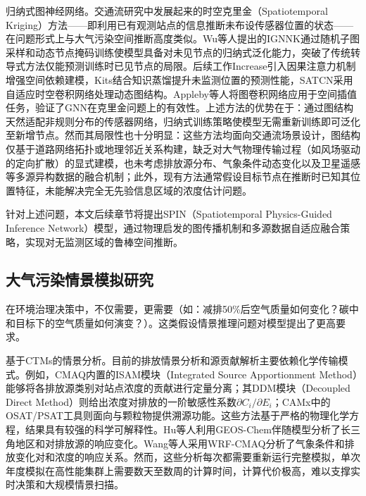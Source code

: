归纳式图神经网络。交通流研究中发展起来的时空克里金（Spatiotemporal Kriging）方法——即利用已有观测站点的信息推断未布设传感器位置的状态——在问题形式上与大气污染空间推断高度类似。Wu等人提出的IGNNK\citep{wu2021inductive}通过随机子图采样和动态节点掩码训练使模型具备对未见节点的归纳式泛化能力，突破了传统转导式方法仅能预测训练时已见节点的局限。后续工作Increase\citep{zheng2023increase}引入因果注意力机制增强空间依赖建模，Kits\citep{xu2025kits}结合知识蒸馏提升未监测位置的预测性能，SATCN\citep{wu2021spatial}采用自适应时空卷积网络处理动态图结构。Appleby等人\citep{appleby2020kriging}将图卷积网络应用于空间插值任务，验证了GNN在克里金问题上的有效性。上述方法的优势在于：通过图结构天然适配非规则分布的传感器网络，归纳式训练策略使模型无需重新训练即可泛化至新增节点。然而其局限性也十分明显：这些方法均面向交通流场景设计，图结构仅基于道路网络拓扑或地理邻近关系构建，缺乏对大气物理传输过程（如风场驱动的定向扩散）的显式建模，也未考虑排放源分布、气象条件动态变化以及卫星遥感等多源异构数据的融合机制；此外，现有方法通常假设目标节点在推断时已知其位置特征，未能解决完全无先验信息区域的浓度估计问题。

针对上述问题，本文后续章节将提出SPIN（Spatiotemporal Physics-Guided Inference Network）模型，通过物理启发的图传播机制和多源数据自适应融合策略，实现对无监测区域的鲁棒空间推断。

\subsection{大气污染情景模拟研究}
\label{subsec:simulation_review}

在环境治理决策中，不仅需要，更需要（如：减排50\%后空气质量如何变化？碳中和目标下的空气质量如何演变？）。这类假设情景推理问题对模型提出了更高要求。

基于CTMs的情景分析。目前的排放情景分析和源贡献解析主要依赖化学传输模式。例如，CMAQ内置的ISAM模块（Integrated Source Apportionment Method）能够将各排放源类别对站点浓度的贡献进行定量分离\citep{appel2021community}；其DDM模块（Decoupled Direct Method）则给出浓度对排放的一阶敏感性系数$\partial C_i / \partial E_i$；CAMx中的OSAT/PSAT工具则面向\ozone{}与颗粒物提供溯源功能。这些方法基于严格的物理化学方程，结果具有较强的科学可解释性。Hu等人\citep{hu2024changing}利用GEOS-Chem伴随模型分析了长三角地区\PM 和\ozone 对排放源的响应变化。Wang等人\citep{wang2019responses}采用WRF-CMAQ分析了气象条件和排放变化对\PM 和\ozone 浓度的响应关系。然而，这些分析每次都需要重新运行完整模拟，单次年度模拟在高性能集群上需要数天至数周的计算时间，计算代价极高，难以支撑实时决策和大规模情景扫描。

